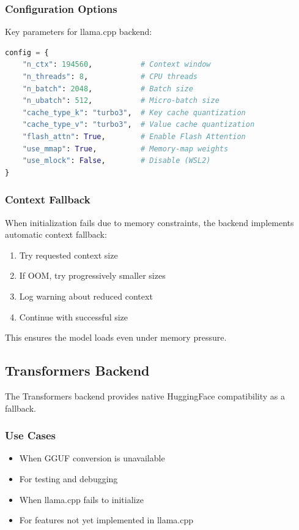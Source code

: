 \subsubsection{Configuration Options}

Key parameters for llama.cpp backend:

\begin{lstlisting}[language=Python, caption=llama.cpp Configuration]
config = {
    "n_ctx": 194560,           # Context window
    "n_threads": 8,            # CPU threads
    "n_batch": 2048,           # Batch size
    "n_ubatch": 512,           # Micro-batch size
    "cache_type_k": "turbo3",  # Key cache quantization
    "cache_type_v": "turbo3",  # Value cache quantization
    "flash_attn": True,        # Enable Flash Attention
    "use_mmap": True,          # Memory-map weights
    "use_mlock": False,        # Disable (WSL2)
}
\end{lstlisting}

\subsubsection{Context Fallback}

When initialization fails due to memory constraints, the backend implements automatic context fallback:

\begin{enumerate}
    \item Try requested context size
    \item If OOM, try progressively smaller sizes
    \item Log warning about reduced context
    \item Continue with successful size
\end{enumerate}

This ensures the model loads even under memory pressure.

\subsection{Transformers Backend}

The Transformers backend provides native HuggingFace compatibility as a fallback.

\subsubsection{Use Cases}

\begin{itemize}
    \item When GGUF conversion is unavailable
    \item For testing and debugging
    \item When llama.cpp fails to initialize
    \item For features not yet implemented in llama.cpp
\end{itemize}

